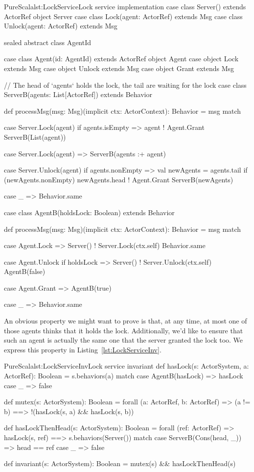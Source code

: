 \documentclass[a4paper,twoside]{article}
\newcommand{\RefCode}[1]{Listing~\ref{#1}}
\begin{document}
\begin{Code}{PureScala}{lst:LockService}{Lock service implementation}
case class Server() extends ActorRef
object Server {
  case class Lock(agent: ActorRef) extends Msg
  case class Unlock(agent: ActorRef) extends Msg
}

sealed abstract class AgentId

case class Agent(id: AgentId) extends ActorRef
object Agent {
  case object Lock   extends Msg
  case object Unlock extends Msg
  case object Grant  extends Msg
}

// The head of `agents` holds the lock, the tail are waiting for the lock
case class ServerB(agents: List[ActorRef]) extends Behavior {

  def processMsg(msg: Msg)(implicit ctx: ActorContext): Behavior = msg match {
    case Server.Lock(agent) if agents.isEmpty =>
      agent ! Agent.Grant
      ServerB(List(agent))

    case Server.Lock(agent) =>
      ServerB(agents :+ agent)

    case Server.Unlock(agent) if agents.nonEmpty =>
      val newAgents = agents.tail
      if (newAgents.nonEmpty) newAgents.head ! Agent.Grant
      ServerB(newAgents)

    case _ =>
      Behavior.same
  }
}

case class AgentB(holdsLock: Boolean) extends Behavior {

  def processMsg(msg: Msg)(implicit ctx: ActorContext): Behavior = msg match {
    case Agent.Lock =>
      Server() ! Server.Lock(ctx.self)
      Behavior.same

    case Agent.Unlock if holdsLock =>
      Server() ! Server.Unlock(ctx.self)
      AgentB(false)

    case Agent.Grant =>
      AgentB(true)

    case _ =>
      Behavior.same
  }
}
\end{Code}

An obvious property we might want to prove is that, at any time, at most one of those agents thinks that it holds the lock. Additionally, we'd like to ensure that such an agent is actually the same one that the server granted the lock too. We express this property in \RefCode{lst:LockServiceInv}.

\begin{Code}{PureScala}{lst:LockServiceInv}{Lock service invariant}
def hasLock(s: ActorSystem, a: ActorRef): Boolean = {
  s.behaviors(a) match {
    case AgentB(hasLock) => hasLock
    case _ => false
  }
}

def mutex(s: ActorSystem): Boolean = forall { (a: ActorRef, b: ActorRef) =>
  (a != b) ==> !(hasLock(s, a) && hasLock(s, b))
}

def hasLockThenHead(s: ActorSystem): Boolean = forall { (ref: ActorRef) =>
  hasLock(s, ref) ==> {
    s.behaviors(Server()) match {
      case ServerB(Cons(head, _)) => head == ref
      case _ => false
    }
  }
}

def invariant(s: ActorSystem): Boolean = {
  mutex(s) && hasLockThenHead(s)
}
\end{Code}
\end{document}
